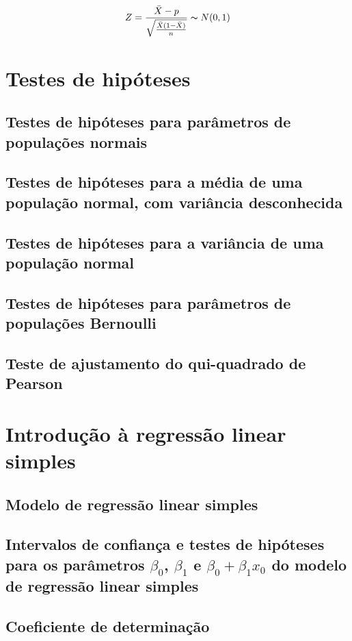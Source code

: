 \documentclass[11pt, a4paper]{article}
\begin{document}
\begin{equation*}
    Z = \frac{\bar{X} - p}{\sqrt{\frac{\bar{X} (1 - \bar{X})}{n}}} \thicksim N(0, 1)
\end{equation*}

\newpage
\section{Testes de hipóteses}

\subsection{Testes de hipóteses para parâmetros de populações normais}

\subsection{Testes de hipóteses para a média de uma população normal, com variância desconhecida}

\subsection{Testes de hipóteses para a variância de uma população normal}

\subsection{Testes de hipóteses para parâmetros de populações Bernoulli}

\subsection{Teste de ajustamento do qui-quadrado de Pearson}

\vspace{20pt}
\section{Introdução à regressão linear simples}

\subsection{Modelo de regressão linear simples}

\subsection{Intervalos de confiança e testes de hipóteses para os parâmetros $\beta_0$, $\beta_1$ e $\beta_0 + \beta_1x_0$ do modelo de regressão linear simples}

\subsection{Coeficiente de determinação}
\end{document}
